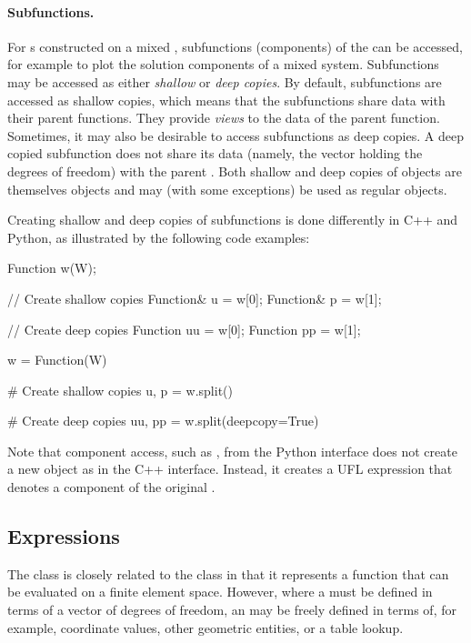 \paragraph{Subfunctions.}

For s constructed on a mixed ,
subfunctions (components) of the  can be accessed, for
example to plot the solution components of a mixed system. Subfunctions
may be accessed as either \emph{shallow} or \emph{deep copies}. By
default, subfunctions are accessed as shallow copies, which means that
the subfunctions share data with their parent functions.  They provide
\emph{views} to the data of the parent function. Sometimes, it may also be
desirable to access subfunctions as deep copies. A deep copied subfunction
does not share its data (namely, the vector holding the degrees of
freedom) with the parent .  Both shallow and deep copies
of  objects are themselves  objects and may
(with some exceptions) be used as regular  objects.

Creating shallow and deep copies of subfunctions is done
differently in C++ and Python, as illustrated by the following code
examples:
\begin{c++}
Function w(W);

// Create shallow copies
Function& u = w[0];
Function& p = w[1];

// Create deep copies
Function uu = w[0];
Function pp = w[1];
\end{c++}
\begin{python}
w = Function(W)

# Create shallow copies
u, p = w.split()

# Create deep copies
uu, pp = w.split(deepcopy=True)
\end{python}
Note that component access, such as , from the Python
interface does not create a new  object as in the C++
interface. Instead, it creates a UFL expression that denotes a
component of the original .

\subsection{Expressions}

The  class is closely related to the 
class in that it represents a function that can be evaluated on a
finite element space. However, where a  must be defined
in terms of a vector of degrees of freedom, an  may be
freely defined in terms of, for example, coordinate values, other
geometric entities, or a table lookup.

